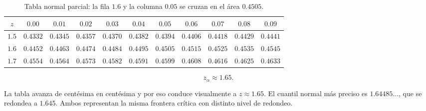 \documentclass[11pt,a4paper]{article}
\begin{document}
\begin{table}[H]
\centering
\scriptsize
\setlength{\tabcolsep}{4.2pt}
\renewcommand{\arraystretch}{1.22}
\begin{tabular}{>{\bfseries}c|cccccccccc}
\toprule
$z$ & $0.00$ & $0.01$ & $0.02$ & $0.03$ & $0.04$ &
\cellcolor{rejectred!22}\color{rejectred!90!black}\bfseries $0.05$ &
$0.06$ & $0.07$ & $0.08$ & $0.09$\\
\midrule
$1.5$ & $0.4332$ & $0.4345$ & $0.4357$ & $0.4370$ & $0.4382$ &
\cellcolor{rejectred!10}$0.4394$ & $0.4406$ & $0.4418$ & $0.4429$ & $0.4441$\\
\rowcolor{acceptblue!10}
\cellcolor{rejectred!22}\color{rejectred!90!black}\bfseries $1.6$ &
$0.4452$ & $0.4463$ & $0.4474$ & $0.4484$ & $0.4495$ &
\cellcolor{rejectred!38}\color{rejectred!90!black}\bfseries $0.4505$ &
$0.4515$ & $0.4525$ & $0.4535$ & $0.4545$\\
$1.7$ & $0.4554$ & $0.4564$ & $0.4573$ & $0.4582$ & $0.4591$ &
\cellcolor{rejectred!10}$0.4599$ & $0.4608$ & $0.4616$ & $0.4625$ & $0.4633$\\
\bottomrule
\end{tabular}
\caption{Tabla normal parcial: la fila $1.6$ y la columna $0.05$ se cruzan en el área $0.4505$.}
\end{table}

\begin{center}
\end{center}

\[
z_{\alpha}\approx1.65.
\]

\begin{aclaracion}
La tabla avanza de centésima en centésima y por eso conduce visualmente a $z\approx1.65$. El cuantil normal más preciso es $1.64485\ldots$, que se redondea a $1.645$. Ambos representan la misma frontera crítica con distinto nivel de redondeo.
\end{aclaracion}
\end{document}
